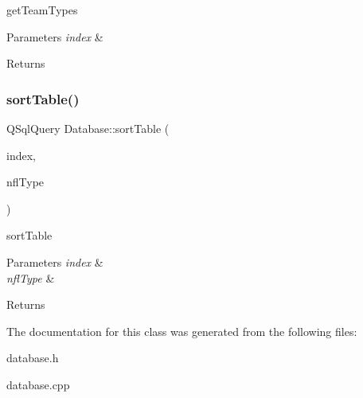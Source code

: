 get\+Team\+Types 


\begin{DoxyParams}{Parameters}
{\em index} & \\
\hline
\end{DoxyParams}
\begin{DoxyReturn}{Returns}

\end{DoxyReturn}
\mbox{\label{class_database_a25d0f42914d6c1741bae914b5c335a8a}} 
\subsubsection{\texorpdfstring{sort\+Table()}{sortTable()}}
{\footnotesize\ttfamily Q\+Sql\+Query Database\+::sort\+Table (\begin{DoxyParamCaption}\item[{int}]{index,  }\item[{Q\+String}]{nfl\+Type }\end{DoxyParamCaption})}



sort\+Table 


\begin{DoxyParams}{Parameters}
{\em index} & \\
\hline
{\em nfl\+Type} & \\
\hline
\end{DoxyParams}
\begin{DoxyReturn}{Returns}

\end{DoxyReturn}


The documentation for this class was generated from the following files\+:\begin{DoxyCompactItemize}
\item 
database.\+h\item 
database.\+cpp\end{DoxyCompactItemize}
